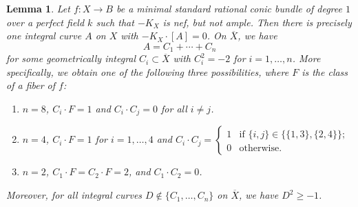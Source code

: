 \documentclass[a4paper, 11pt, reqno]{amsart}
\numberwithin{equation}{section} \numberwithin{figure}{section}
\newcommand{\ra}{\rightarrow}
\newtheorem{lemma}{Lemma}
\theoremstyle{definition}
\numberwithin{lemma}{section}
\begin{document}
\begin{lemma}\label{lem:-KXnef}
    Let $f \colon X \ra B$ be a minimal standard rational conic bundle of degree $1$ over a perfect field $k$ such that $-K_X$ is nef, but not ample. Then there is precisely one integral curve $A$ on $X$ with $-K_X \cdot [A] = 0$. On $\overline{X}$, we have \[A = C_1 + \cdots + C_n\] for some geometrically integral $C_i \subset \overline{X}$ with $C_i^2 = -2$ for $i = 1, \ldots, n$. More specifically, we obtain one of the following three possibilities, where $F$ is the class of a fiber of $f$:
    \begin{enumerate}
            \item $n = 8$, $C_i \cdot F = 1$ and $C_i \cdot C_j = 0$ for all $i \neq j$.
        
            \item $n = 4$, $C_i \cdot F = 1$ for $i = 1, \ldots, 4$ and $C_i \cdot C_j = \begin{cases}
                1 &\text{if $\{i, j\} \in \{ \{1, 3\}, \{2, 4\}\}$;}\\
                0 &\text{otherwise.}
            \end{cases}$
            
            \item $n = 2$, $C_1 \cdot F = C_2 \cdot F = 2$, and $C_1 \cdot C_2 = 0$.
        \end{enumerate}
        
        Moreover, for all integral curves $D \notin \{C_1, \ldots, C_n\}$ on $\overline{X}$, we have $D^2 \geq -1$.
\end{lemma}
\end{document}
